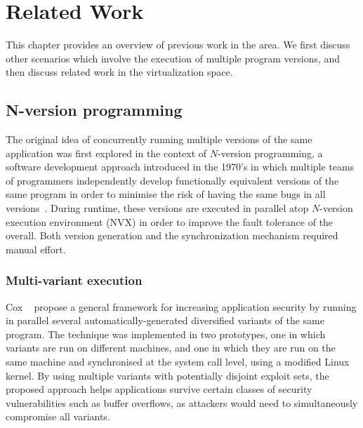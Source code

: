\chapter{Related Work}
\label{chap:related}

This chapter provides an overview of previous work in the area.  We first
discuss other scenarios which involve the execution of multiple program
versions, and then discuss related work in the virtualization space.

\section{N-version programming}

The original idea of concurrently running multiple versions of the same
application was first explored in the context of $N$-version programming, a
software development approach introduced in the 1970's in which multiple teams
of programmers independently develop functionally equivalent versions of the
same program in order to minimise the risk of having the same bugs in all
versions~\cite{chen1995}. During runtime, these versions are executed in
parallel atop $N$-version execution environment (NVX)  in order to improve the
fault tolerance of the overall. Both version generation and the synchronization
mechanism required manual effort.



\subsection{Multi-variant execution}

Cox \etal~\cite{cox2006} propose a general framework for increasing application
security by running in parallel several automatically-generated diversified
variants of the same program.  The technique was implemented in two prototypes,
one in which variants are run on different machines, and one in which they are
run on the same machine and synchronised at the system call level, using a
modified Linux kernel.  By using multiple variants with potentially disjoint
exploit sets, the proposed approach helps applications survive certain classes
of security vulnerabilities such as buffer overflows, as attackers would need
to simultaneously compromise all variants.

